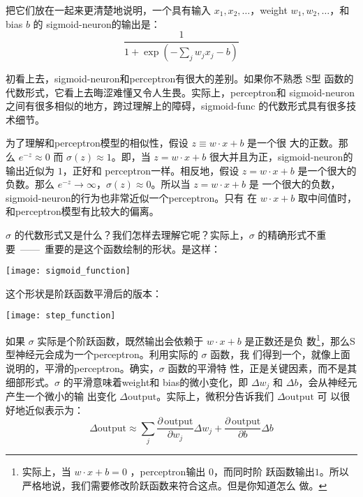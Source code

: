把它们放在一起来更清楚地说明，一个具有输入 $x_1,x_2,\ldots$，\gls*{weight}
$w_1,w_2,\ldots$，和\gls*{bias} $b$ 的 \gls*{sigmoid-neuron}的输出是：
\begin{equation}
  \frac{1}{1+\exp(-\sum_j w_j x_j-b)}
  \label{eq:4}\tag{4}
\end{equation}

初看上去，\gls*{sigmoid-neuron}和\gls*{perceptron}有很大的差别。如果你不熟悉 S型
函数的代数形式，它看上去晦涩难懂又令人生畏。实际上，\gls*{perceptron}和
\gls*{sigmoid-neuron}之间有很多相似的地方，跨过理解上的障碍，\gls*{sigmoid-func}
的代数形式具有很多技术细节。

为了理解和\gls*{perceptron}模型的相似性，假设 $z \equiv w \cdot x + b$ 是一个很
大的正数。那么 $e^{-z} \approx 0$ 而 $\sigma(z) \approx 1$。即，当 $z = w \cdot
x+b$ 很大并且为正，\gls*{sigmoid-neuron}的输出近似为 $1$，正好和%
\gls*{perceptron}一样。相反地，假设 $z = w \cdot x+b$ 是一个很大的负数。那么
$e^{-z} \rightarrow \infty$，$\sigma(z) \approx 0$。所以当 $z = w \cdot x +b$ 是
一个很大的负数，\gls*{sigmoid-neuron}的行为也非常近似一个\gls*{perceptron}。只有
在 $w \cdot x+b$ 取中间值时，和\gls*{perceptron}模型有比较大的偏离。

$\sigma$ 的代数形式又是什么？我们怎样去理解它呢？实际上，$\sigma$ 的精确形式不重
要~——~重要的是这个函数绘制的形状。是这样：
\begin{center}
  \texttt{[image: sigmoid\_function]}
  \label{fig:SigmoidFunction}
\end{center}

这个形状是阶跃函数平滑后的版本：
\begin{center}
  \texttt{[image: step\_function]}
  \label{fig:StepFunction}
\end{center}

如果 $\sigma$ 实际是个阶跃函数，既然输出会依赖于 $w\cdot x+b$ 是正数还是负
数\footnote{实际上，当 $w \cdot x +b = 0$ ，\gls*{perceptron}输出 $0$，而同时阶
  跃函数输出$1$。所以严格地说，我们需要修改阶跃函数来符合这点。但是你知道怎么
  做。}，那么S型神经元会成为一个\gls*{perceptron}。利用实际的 $\sigma$ 函数，我
们得到一个，就像上面说明的，平滑的\gls*{perceptron}。确实，$\sigma$ 函数的平滑特
性，正是关键因素，而不是其细部形式。$\sigma$ 的平滑意味着\gls*{weight}和%
\gls*{bias}的微小变化，即 $\Delta w_j$ 和 $\Delta b$，会从神经元产生一个微小的输
出变化 $\Delta \mbox{output}$。实际上，微积分告诉我们 $\Delta \mbox{output}$ 可
以很好地近似表示为：
\begin{equation}
  \Delta \mbox{output} \approx \sum_j \frac{\partial \, \mbox{output}}{\partial w_j}
  \Delta w_j + \frac{\partial \, \mbox{output}}{\partial b} \Delta b
  \label{eq:5}\tag{5}
\end{equation}

